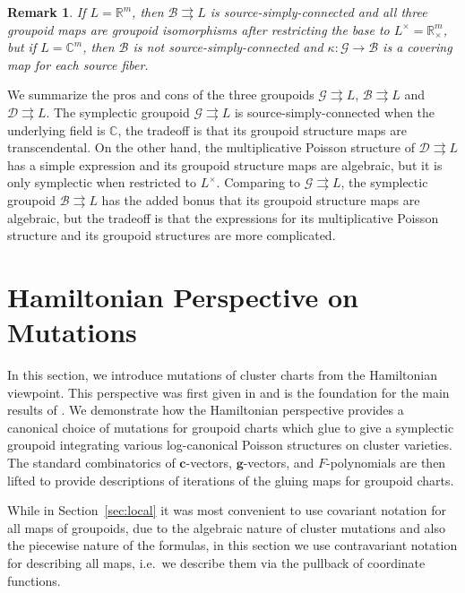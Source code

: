 \documentclass{amsart}
\newtheorem{remark}[theorem]{Remark}
\numberwithin{equation}{section}
\newcommand{\bfc}{\mathbf{c}}
\newcommand{\bfg}{\mathbf{g}}
\newcommand{\cB}{\mathcal{B}}
\newcommand{\cD}{\mathcal{D}}
\newcommand{\cG}{\mathcal{G}}
\newcommand{\CC}{\mathbb{C}}
\newcommand{\RR}{\mathbb{R}}
\newcommand{\rra}{\rightrightarrows}
\begin{document}
\begin{remark}
  If $L = \RR^m$, then $\cB \rra L$ is source-simply-connected and all three groupoid maps are groupoid isomorphisms after restricting the base to $L^\times = \RR_\times^m$, but if $L = \CC^m$, then $\cB$ is not source-simply-connected and $\kappa: \cG \to \cB$ is a covering map for each source fiber.
\end{remark}

We summarize the pros and cons of the three groupoids $\cG \rra L$, $\cB \rra L$ and $\cD \rra L$.
The symplectic groupoid $\cG \rra L$ is source-simply-connected when the underlying field is $\CC$, the tradeoff is that its groupoid structure maps are transcendental.
On the other hand, the multiplicative Poisson structure of $\cD \rra L$ has a simple expression and its groupoid structure maps are algebraic, but it is only symplectic when restricted to $L^\times$.
Comparing to $\cG \rra L$, the symplectic groupoid $\cB \rra L$ has the added bonus that its groupoid structure maps are algebraic, but the tradeoff is that the expressions for its multiplicative Poisson structure and its groupoid structures are more complicated.


\section{Hamiltonian Perspective on Mutations}
\label{sec:mutations}

In this section, we introduce mutations of cluster charts from the Hamiltonian viewpoint.
This perspective was first given in \cite{FG09c} and is the foundation for the main results of \cite{GNR17}.
We demonstrate how the Hamiltonian perspective provides a canonical choice of mutations for groupoid charts which glue to give a symplectic groupoid integrating various log-canonical Poisson structures on cluster varieties.
The standard combinatorics of $\bfc$-vectors, $\bfg$-vectors, and $F$-polynomials are then lifted to provide descriptions of iterations of the gluing maps for groupoid charts.

While in Section~\ref{sec:local} it was most convenient to use covariant notation for all maps of groupoids, due to the algebraic nature of cluster mutations and also the piecewise nature of the formulas, in this section we use contravariant notation for describing all maps, i.e.\ we describe them via the pullback of coordinate functions.
\end{document}
